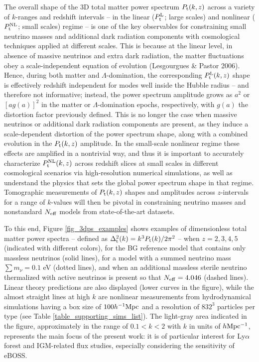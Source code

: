 \documentclass{emulateapj}
\begin{document}
The overall shape of the 3D total matter power spectrum $P_{\rm t}(k,z)$ across a variety of $k$-ranges and redshift intervals
-- in the linear  ($P^{\rm L}_{\rm t}$; large scales)
and nonlinear ($P^{\rm NL}_{\rm t}$; small scales) regime -- 
is one of the key 
observables for constraining small neutrino masses and additional dark radiation components with cosmological
techniques applied at different scales. This is because at the linear level,
in absence of massive neutrinos and extra dark radiation,  
the matter fluctuations obey a scale-independent equation of evolution 
(Lesgourgues \& Pastor 2006). Hence,  during both matter and $\Lambda$-domination,
the corresponding $P^{\rm L}_{\rm t}(k,z)$ shape is effectively
redshift independent for modes well inside the Hubble radius -- and therefore not informative; instead, the 
power spectrum amplitude grows as $a^2$ or $[a g(a)]^2$ in the  matter or $\Lambda$-domination
epochs, respectively, with $g(a)$ the distortion factor previously defined. 
This is no longer the case when
massive neutrinos or additional dark radiation components are  present, as they 
induce a scale-dependent distortion of the power spectrum shape, along with a combined 
evolution in the $P_{\rm t}(k,z)$ amplitude. In the small-scale nonlinear regime these effects are amplified in
a nontrivial way, and thus
 it is important to accurately characterize $P^{\rm NL}_{\rm t}(k,z)$ across redshift slices at small scales in different cosmological scenarios
via high-resolution numerical simulations, 
as well as understand the physics that sets the global power spectrum shape in that regime. 
Tomographic measurements of $P_{\rm t}(k,z)$ shapes and amplitudes across  $z$-intervals for a range of $k$-values will then be pivotal in
constraining neutrino masses and nonstandard $N_{\rm eff}$ models from state-of-the-art datasets.  

To this end, Figure \ref{fig_3dps_examples} shows examples of 
dimensionless total matter power spectra -- defined as $\Delta^2_{\rm t}(k) = k^3 P_{\rm t}(k)/2 \pi^2$ --
when $z=2,3,4,5$ (indicated with different colors),
for the BG reference model that contains only massless neutrinos (solid lines),
for a model with a summed neutrino mass $\sum m_{\nu}=0.1$ eV (dotted lines), and when an additional
massless sterile neutrino thermalized with active neutrinos is present so that $N_{\rm eff} = 4.046$ (dashed lines).
Linear theory predictions 
are also displayed (lower curves in the figure), while 
the almost straight lines at high $k$ 
are nonlinear measurements from hydrodynamical simulations  having a box size of $100 h^{-1}{\rm Mpc}$ and a
resolution of $832^3$ particles per type (see Table \ref{table_supporting_sims_list}).
The light-gray area indicated in the figure, approximately in the range of  $0.1 <  k  < 2$  with $k$ in units of
$h {\rm Mpc^{-1}}$, represents the main focus of the present work:
it is of particular interest for Ly$\alpha$ forest and IGM-related  flux studies, especially considering the sensitivity of eBOSS. 
\end{document}
